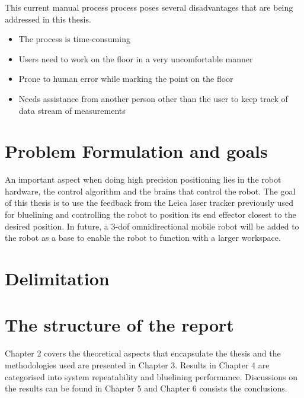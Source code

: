 \documentclass{LTHthesis}
\begin{document}
        This current manual process process poses several disadvantages that are being addressed in this thesis.

        \begin{itemize}
            \item The process is time-consuming
            \item Users need to work on the floor in a very uncomfortable manner
            \item Prone to human error while marking the point on the floor
            \item Needs assistance from another person other than the user to keep track of data stream of measurements
        \end{itemize}
    \section{Problem Formulation and goals}
        An important aspect when doing high precision positioning lies in the robot hardware, the control algorithm and the brains that control the robot. The goal of this thesis is to use the feedback from the Leica laser tracker previously used for bluelining and controlling the robot to position its end effector closest to the desired position. In future, a 3-dof omnidirectional mobile robot will be added to the robot as a base to enable the robot to function with a larger workspace. 
    \section{Delimitation}
        
    \section{The structure of the report}
        Chapter 2 covers the theoretical aspects that encapsulate the thesis and the methodologies used are presented in Chapter 3. Results in Chapter 4 are categorised into system repeatability and bluelining performance. Discussions on the results can be found in Chapter 5 and Chapter 6 consists the conclusions.
\end{document}
